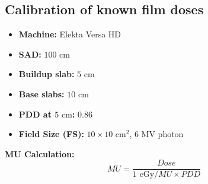 \subsection{Calibration of known film doses}

\begin{itemize}
    \item \textbf{Machine:} Elekta Versa HD
    \item \textbf{SAD:} $100\text{ cm}$
    \item \textbf{Buildup slab:} $5\text{ cm}$
    \item \textbf{Base slabs:} $10\text{ cm}$
    \item \textbf{PDD at $5\text{ cm}$:} 0.86
    \item \textbf{Field Size (FS):} $10 \times 10\text{ cm}^2$, 6 MV photon
\end{itemize}

\textbf{MU Calculation:}
\begin{equation}
    MU = \frac{Dose}{1\text{ cGy}/MU \times PDD}
\end{equation}

